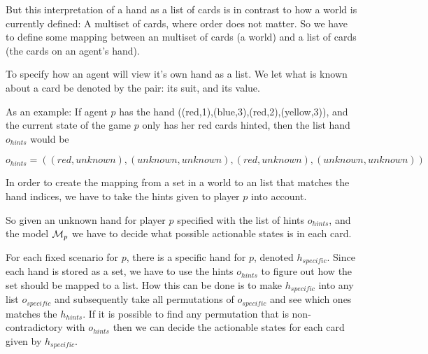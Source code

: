 
But this interpretation of a hand as a list of cards is in contrast to how 
a world is currently defined: A multiset of cards, where order does not matter. So we have to define some mapping between an multiset of cards (a world) and a list of cards (the cards on an agent's hand).



To specify how an agent will view it's own hand as a list. We let what is known about a card be denoted by the pair: its suit, and its value. 



As an example: If agent $p$ has the hand ((red,1),(blue,3),(red,2),(yellow,3)), and the current state of the game $p$ only has her red cards hinted, then the list hand $o_{hints}$ would be

\[o_{hints} = ((red,unknown),(unknown,unknown),(red,unknown),(unknown,unknown))\]


In order to create the mapping from a set in a world to an list that matches the hand indices, we have to take the hints given to player $p$ into account.

So given an unknown hand for player $p$ specified with the list of hints $o_{hints}$, and the model $\mathcal{M}_p$ we have to decide what possible actionable states is in each card. 

For each fixed scenario for $p$, there is a specific hand for $p$, denoted $h_{specific}$. Since each hand is stored as a set, we have to use the hints $o_{hints}$ to figure out how the set should be mapped to a list. How this can be done is to make $h_{specific}$ into any list $o_{specific}$ and subsequently take all permutations of $o_{specific}$ and see which ones matches the $h_{hints}$. If it is possible to find any permutation that is non-contradictory with $o_{hints}$ then we can decide the actionable states for each card given by $h_{specific}$.

